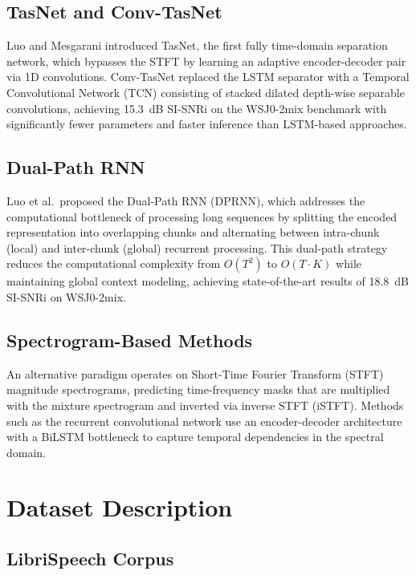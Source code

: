 \documentclass[conference]{IEEEtran}
\begin{document}
\subsection{TasNet and Conv-TasNet}

Luo and Mesgarani introduced TasNet, the first fully time-domain separation network, which bypasses the STFT by learning an adaptive encoder-decoder pair via 1D convolutions. Conv-TasNet replaced the LSTM separator with a Temporal Convolutional Network (TCN) consisting of stacked dilated depth-wise separable convolutions, achieving 15.3~dB SI-SNRi on the WSJ0-2mix benchmark with significantly fewer parameters and faster inference than LSTM-based approaches.

\subsection{Dual-Path RNN}

Luo et al.\ proposed the Dual-Path RNN (DPRNN), which addresses the computational bottleneck of processing long sequences by splitting the encoded representation into overlapping chunks and alternating between intra-chunk (local) and inter-chunk (global) recurrent processing. This dual-path strategy reduces the computational complexity from $O(T^2)$ to $O(T \cdot K)$ while maintaining global context modeling, achieving state-of-the-art results of 18.8~dB SI-SNRi on WSJ0-2mix.

\subsection{Spectrogram-Based Methods}

An alternative paradigm operates on Short-Time Fourier Transform (STFT) magnitude spectrograms, predicting time-frequency masks that are multiplied with the mixture spectrogram and inverted via inverse STFT (iSTFT). Methods such as the recurrent convolutional network use an encoder-decoder architecture with a BiLSTM bottleneck to capture temporal dependencies in the spectral domain.

\section{Dataset Description}
\label{sec:dataset}

\subsection{LibriSpeech Corpus}
\end{document}

